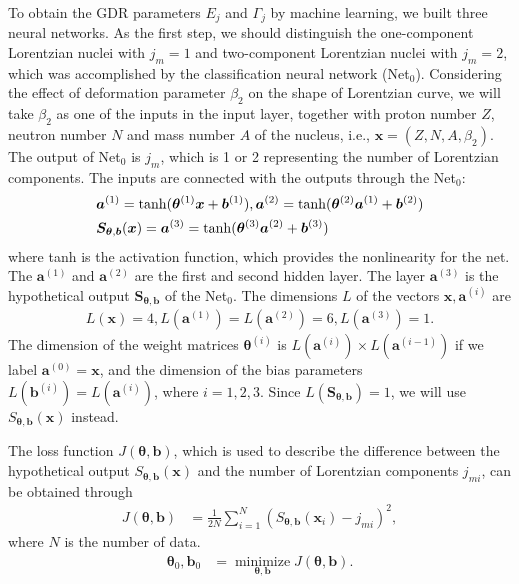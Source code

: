 \documentclass[twocolumn,showpacs,superscriptaddress,amsmath,amssymb,prc,preprintnumbers]{revtex4-1}
\begin{document}
To obtain the GDR parameters $E_j$ and $\Gamma_j$ by machine learning, we built three neural  networks. As the first step, we should distinguish the one-component Lorentzian nuclei with $j_m = 1$ and two-component Lorentzian nuclei with $j_m = 2$, which was accomplished by the classification neural network (Net$_0$). Considering the effect of deformation parameter $\beta_2$ on the shape of Lorentzian curve, we will take $\beta_2$ as one of the inputs in the input layer, together with proton number $Z$, neutron number $N$ and mass number $A$ of the nucleus, i.e., $\boldsymbol{x} = (Z, N, A, \beta_2)$. The output of Net$_0$ is  $j_m$, which is 1 or 2 representing the number of Lorentzian components.
The inputs are connected with the outputs through the Net$_0$:
\begin{align}
&\boldsymbol{a}^{(1)} = {\rm tanh}(\boldsymbol{\theta}^{(1)} \boldsymbol{x}  + \boldsymbol{b}^{(1)}) ,
\boldsymbol{a}^{(2)} = {\rm tanh}(\boldsymbol{\theta}^{(2)} \boldsymbol{a}^{(1)} +\boldsymbol{b}^{(2)}) \notag\\
&\boldsymbol{S}_{\boldsymbol{\theta},\boldsymbol{b}} (\boldsymbol{x}) = \boldsymbol{a}^{(3)} = {\rm tanh}(\boldsymbol{\theta}^{(3)} \boldsymbol{a}^{(2)} + \boldsymbol{b}^{(3)})
\end{align}
where tanh is the activation function, which provides the nonlinearity for the net.
The $\boldsymbol{a}^{(1)}$ and $\boldsymbol{a}^{(2)}$ are the first and second hidden layer.
The layer $\boldsymbol{a}^{(3)}$ is the hypothetical output $\boldsymbol{S}_{\boldsymbol{\theta},\boldsymbol{b}} $ of the Net$_0$. The dimensions $L$ of the vectors $\boldsymbol{x}, \boldsymbol{a}^{(i)}$  are
\begin{align}
L(\boldsymbol{x}) = 4 , L(\boldsymbol{a}^{(1)}) =L(\boldsymbol{a}^{(2)})= 6 , L(\boldsymbol{a}^{(3)}) = 1.
\end{align}
The dimension of the weight matrices $\boldsymbol{\theta}^{(i)}$ is $L(\boldsymbol{a}^{(i)}) \times L(\boldsymbol{a}^{(i-1)})$ if we label $\boldsymbol{a}^{(0)} = \boldsymbol{x}$, and the dimension of the bias parameters $L(\boldsymbol{b}^{(i)})= L(\boldsymbol{a}^{(i)})$, where $i=1,2,3$.  Since $L(\boldsymbol{S}_{\boldsymbol{\theta},\boldsymbol{b}})=1$, we will use $S_{\boldsymbol{\theta},\boldsymbol{b}} (\boldsymbol{x})$ instead.


The loss function $J(\boldsymbol{\theta},\boldsymbol{b})$, which is used to describe the difference between the hypothetical output $S_{\boldsymbol{\theta},\boldsymbol{b}} (\boldsymbol{x})$ and  the number of Lorentzian components $j_{mi}$, can be obtained through
\begin{align}
J(\boldsymbol{\theta},\boldsymbol{b}) &= \frac{1}{2N}\sum_{i=1}^N (S_{\boldsymbol{\theta},\boldsymbol{b}} (\boldsymbol{x}_i)-j_{mi})^2,
\end{align}
where $N$ is the number of data.
\begin{align}
\boldsymbol{\theta}_{0},\boldsymbol{b}_{0} &= \mathop{minimize}\limits_{\boldsymbol{\theta},\boldsymbol{b}}  J(\boldsymbol{\theta},\boldsymbol{b}).
\end{align}
\end{document}
